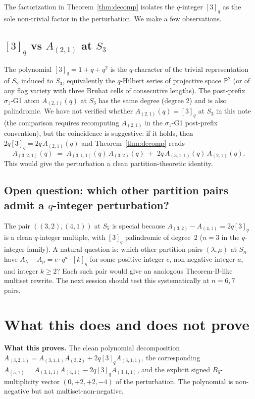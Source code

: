 \documentclass[11pt]{article}
\theoremstyle{definition}
\begin{document}
The factorization in Theorem~\ref{thm:decomp} isolates the $q$-integer $[3]_q$
as the sole non-trivial factor in the perturbation. We make a few observations.

\subsection*{$[3]_q$ vs $A_{(2,1)}$ at $S_3$}

The polynomial $[3]_q = 1 + q + q^2$ is the $q$-character of the trivial
representation of $S_2$ induced to $S_3$, equivalently the $q$-Hilbert series of
projective space $\mathbb{P}^2$ (or of any flag variety with three Bruhat cells of consecutive lengths). The post-prefix
$\sigma_1$-G1 atom $A_{(2,1)}(q)$ at $S_3$ has the same degree (degree $2$) and is also
palindromic. We have not verified whether $A_{(2,1)}(q) = [3]_q$ at $S_3$ in this
note (the comparison requires recomputing $A_{(2,1)}$ in the $\sigma_1$-G1
post-prefix convention), but the coincidence is suggestive: if it holds, then
$2q [3]_q = 2 q\, A_{(2,1)}(q)$ and Theorem~\ref{thm:decomp} reads
\[
A_{(3,2,1)}(q) \;=\; A_{(3,1,1)}(q)\, A_{(3,2)}(q) \;+\; 2 q\, A_{(3,1,1)}(q)\, A_{(2,1)}(q).
\]
This would give the perturbation a clean partition-theoretic identity.

\subsection*{Open question: which other partition pairs admit a $q$-integer perturbation?}

The pair $((3,2), (4,1))$ at $S_5$ is special because $A_{(3,2)} - A_{(4,1)} = 2q[3]_q$ is a clean $q$-integer multiple, with $[3]_q$ palindromic of degree~$2$ ($n=3$ in the $q$-integer family). A natural question is: which other partition pairs $(\lambda, \mu)$ at $S_n$ have $A_\lambda - A_\mu = c \cdot q^a \cdot [k]_q$ for some positive integer $c$, non-negative integer $a$, and integer $k \geq 2$? Each such pair would give an analogous Theorem-B-like multiset rewrite. The next session should test this systematically at $n = 6, 7$ pairs.

\section{What this does and does not prove}

\textbf{What this proves.} The clean polynomial decomposition
$A_{(3,2,1)} = A_{(3,1,1)} A_{(3,2)} + 2q [3]_q A_{(3,1,1)}$, the corresponding
$A_{(5,1)} = A_{(3,1,1)} A_{(4,1)} - 2q [3]_q A_{(3,1,1)}$, and the explicit
signed $B_6$-multiplicity vector $(0, +2, +2, -4)$ of the perturbation. The
polynomial is non-negative but not multiset-non-negative.
\end{document}
